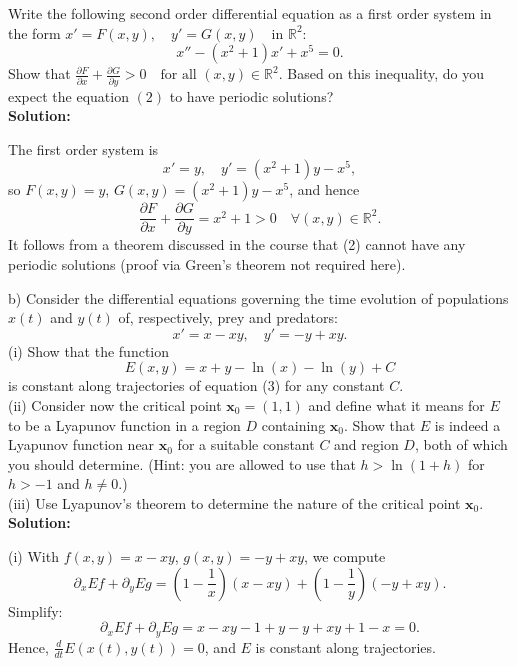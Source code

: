 \documentclass[10pt,landscape]{article}
\begin{document}
\begin{multicols}{2}
Write the following second order differential equation as a first order system in the form
$
x' = F(x, y), \quad y' = G(x, y) \quad \text{in } \mathbb{R}^2:
$\\
\[
x'' - (x^2 + 1)x' + x^5 = 0. \tag{2}
\]
Show that
$
\frac{\partial F}{\partial x} + \frac{\partial G}{\partial y} > 0 \quad \text{for all } (x, y) \in \mathbb{R}^2.
$
Based on this inequality, do you expect the equation \((2)\) to have periodic solutions?\\
\bigskip
\textbf{Solution:}

The first order system is\\
\[
x' = y, \quad y' = (x^2 + 1)y - x^5,
\]
so \(F(x, y) = y\), \(G(x, y) = (x^2 + 1)y - x^5\), and hence\\
\[
\frac{\partial F}{\partial x} + \frac{\partial G}{\partial y} = x^2 + 1 > 0 \quad \forall (x, y) \in \mathbb{R}^2.
\]
It follows from a theorem discussed in the course that (2) cannot have any periodic solutions (proof via Green’s theorem not required here).


b) Consider the differential equations governing the time evolution of populations \(x(t)\) and \(y(t)\) of, respectively, prey and predators:\\
\[
x' = x - xy, \quad y' = -y + xy. \tag{3}
\]
(i) Show that the function\\
\[
E(x, y) = x + y - \ln(x) - \ln(y) + C
\]
is constant along trajectories of equation (3) for any constant \(C\).\\

(ii) Consider now the critical point \(\mathbf{x}_0 = (1, 1)\) and define what it means for \(E\) to be a Lyapunov function in a region \(D\) containing \(\mathbf{x}_0\). Show that \(E\) is indeed a Lyapunov function near \(\mathbf{x}_0\) for a suitable constant \(C\) and region \(D\), both of which you should determine. (Hint: you are allowed to use that \(h > \ln(1 + h)\) for \(h > -1\) and \(h \neq 0\).)\\

(iii) Use Lyapunov’s theorem to determine the nature of the critical point \(\mathbf{x}_0\).\\
\bigskip
\textbf{Solution:}


(i) With \(f(x, y) = x - xy\), \(g(x, y) = -y + xy\), we compute\\
\[
\partial_x E f + \partial_y E g =
\left(1 - \frac{1}{x}\right)(x - xy) + \left(1 - \frac{1}{y}\right)(-y + xy).
\]
Simplify:\\
\[
\partial_x E f + \partial_y E g = x - xy - 1 + y - y + xy + 1 - x = 0.
\]
Hence, \(\frac{d}{dt} E(x(t), y(t)) = 0\), and \(E\) is constant along trajectories.\\


\end{multicols}
\end{document}
